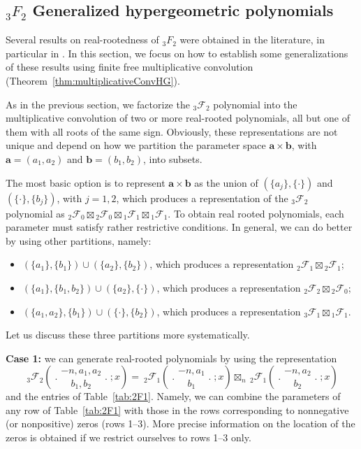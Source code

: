 \documentclass[reqno,11pt]{amsart}
\theoremstyle{remark}
\newcommand{\FF}{\mathcal{F}}
\newcommand*\pFq[5]{%
 {\ }_{#1}{\mathcal F}_{#2}{\left(\genfrac..{0pt}{}{#3}{#4};#5\right)}%
}
\begin{document}
\subsection{${}_3 F_2$ Generalized hypergeometric polynomials} \label{sec:3F2real}

Several results on real-rootedness of ${}_3 F_2$ were obtained in the literature, in particular in \cite{Driver/Jordaan, MR2324318, johnston2006properties,johnston2015quasi}. In this section, we focus on how to establish some generalizations of these results using finite free multiplicative convolution (Theorem~\ref{thm:multiplicativeConvHG}).

As in the previous section, we factorize the ${}_3 \FF_2$ polynomial into the multiplicative convolution of two or more real-rooted polynomials, all but one of them with all roots of the same sign. Obviously, these representations are not unique and depend on how we partition the parameter space $\bm a \times \bm b$, with $\bm a=(a_1, a_2)$ and $\bm b=(b_1, b_2)$, into subsets. 

The most basic option is to represent $\bm a \times \bm b$ as the union of $(\{a_j\}, \{\cdot\})$ and $(\{ \cdot\} , \{ b_j\} )$, with $j=1, 2$, which produces a representation of the ${}_3 \FF_2$ polynomial as ${}_2 \FF_0\boxtimes {}_2 \FF_0\boxtimes {}_1 \FF_1\boxtimes {}_1 \FF_1$. To obtain real rooted polynomials, each parameter must satisfy rather restrictive conditions. In general, we can do better by using other partitions, namely:
\begin{itemize}
    \item $(\{a_1\}, \{b_1\}) \cup (\{a_2\}, \{b_2\})$, which produces a representation ${}_2 \FF_1 \boxtimes {}_2 \FF_1$;
    \item $(\{ a_1\}, \{b_1, b_2\}) \cup (\{a_2\}, \{\cdot\})$, which produces a representation ${}_2 \FF_2 \boxtimes {}_2 \FF_0$;
    \item $(\{ a_1, a_2\}, \{b_1\}) \cup (\{\cdot \}, \{b_2\})$, which produces a representation ${}_3 \FF_1 \boxtimes {}_1 \FF_1$.
\end{itemize}

Let us discuss these three partitions more systematically. 

\textbf{Case 1:} we can generate real-rooted polynomials by using the representation
\begin{equation} \label{3F2Real1}
    \pFq{3}{2}{-n,a_1,a_2}{b_1,b_2}{x}=\pFq{2}{1}{-n,a_1}{b_1}{x} \boxtimes_n \pFq{2}{1}{-n,a_2}{b_2}{x}
\end{equation}
and the entries of Table~\ref{tab:2F1}. Namely, we can combine the parameters of any row of Table~\ref{tab:2F1} with those in the rows corresponding to nonnegative (or nonpositive) zeros (rows 1--3). More precise information on the location of the zeros is obtained if we restrict ourselves to rows 1--3 only.
\end{document}
